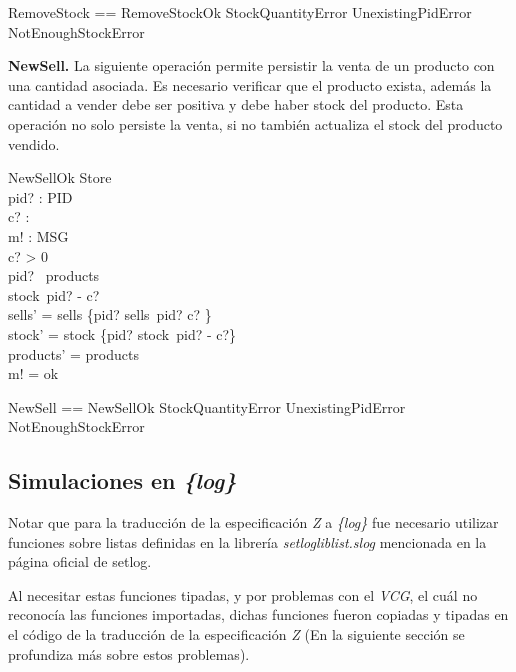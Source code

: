 \documentclass[fleqn,colorlinks,linkcolor=blue,citecolor=blue,urlcolor=blue]{article}
\begin{document}
\begin{zed}
RemoveStock == RemoveStockOk \lor StockQuantityError \lor UnexistingPidError \lor NotEnoughStockError
\end{zed}

\noindent
\textbf{NewSell.} La siguiente operación permite persistir la venta de un producto con una cantidad asociada. Es necesario verificar que el producto exista, además la cantidad a vender debe ser positiva y debe haber stock del producto. Esta operación no solo persiste la venta, si no también actualiza el stock del producto vendido.

\begin{schema}{NewSellOk}
\Delta Store \\
pid? : PID \\
c? : \nat \\
m! : MSG \\
\where
c? > 0 \\
pid? \in \dom~products \\
stock~pid? - c? \\
sells' = sells \oplus \{pid? \mapsto sells~pid? \cat \langle c? \rangle\} \\
stock' = stock \oplus \{pid? \mapsto stock~pid? - c?\} \\
products' = products \\
m! = ok
\end{schema}

\begin{zed} 
NewSell == NewSellOk \lor StockQuantityError \lor UnexistingPidError \lor NotEnoughStockError 
\end{zed}

\subsection{Simulaciones en \textit{\{log\}}}

Notar que para la traducción de la especificación \textit{Z} a \textit{\{log\}} fue necesario utilizar funciones sobre listas definidas en la librería \textit{setlogliblist.slog} mencionada en la página oficial de setlog. 

Al necesitar estas funciones tipadas, y por problemas con el \textit{VCG}, el cuál no reconocía las funciones importadas, dichas funciones fueron copiadas y tipadas en el código de la traducción de la especificación \textit{Z} (En la siguiente sección se profundiza más sobre estos problemas). 

\vspace{0.2cm}
\end{document}
